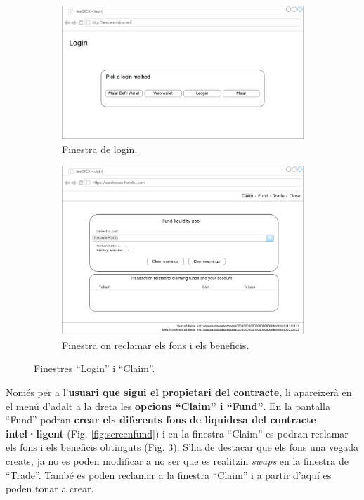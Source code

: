 \documentclass[11pt,a4paper]{article}
\begin{document}
\begin{figure}[!htb]
\begin{subfigure}[b]{0.39\textwidth}
  \includegraphics[width=\linewidth]{screen_login.png}
  \caption{Finestra de login.}\label{fig:screenlogin}
\end{subfigure}\hfill
\begin{subfigure}[b]{0.59\textwidth}
  \includegraphics[width=\linewidth]{screen_claim.png}
  \caption{Finestra on reclamar els fons i els beneficis.}\label{fig:screenclaim}
\end{subfigure}\hfill
\caption{Finestres ``Login'' i ``Claim''.}
\end{figure}

Només per a l'\textbf{usuari que sigui el propietari del contracte}, li apareixerà en el menú d'adalt a la dreta les \textbf{opcions ``Claim'' i ``Fund''}. En la pantalla ``Fund'' podran \textbf{crear els diferents fons de liquidesa del contracte intel·ligent} (Fig. \ref{fig:screenfund}) i en la finestra ``Claim'' es podran reclamar els fons i els beneficis obtinguts (Fig. \ref{fig:screenclaim}). S'ha de destacar que els fons una vegada creats, ja no es poden modificar a no ser que es realitzin \textit{swaps} en la finestra de ``Trade''. També es poden reclamar a la finestra ``Claim'' i a partir d'aquí es poden tonar a crear.
\end{document}
